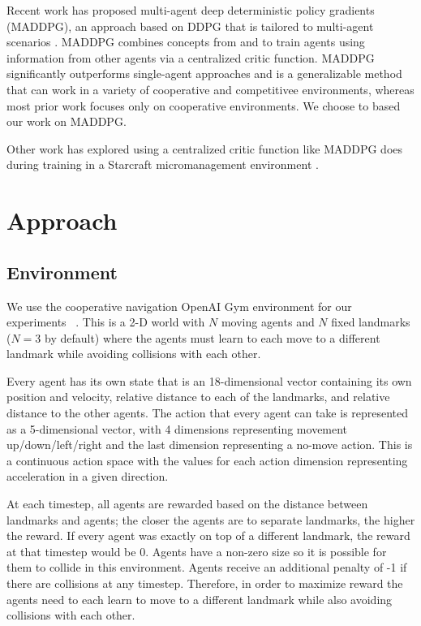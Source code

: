\documentclass{article}
\begin{document}
Recent work has proposed multi-agent deep deterministic policy gradients (MADDPG), an approach based on DDPG that is tailored to multi-agent scenarios \cite{maddpg}. MADDPG combines concepts from \cite{suttonbarto1998rl} and \cite{lillicrap2015continuous} to train agents using information from other agents via a centralized critic function. MADDPG significantly outperforms single-agent approaches and is a generalizable method that can work in a variety of cooperative and competitivee environments, whereas most prior work focuses only on cooperative environments. We choose to based our work on MADDPG.

Other work has explored using a centralized critic function like MADDPG does during training in a Starcraft micromanagement environment \cite{coma}.

\section{Approach}

\subsection{Environment}

We use the cooperative navigation OpenAI Gym environment for our experiments ~\cite{openaigym}. This is a 2-D world with $N$ moving agents and $N$ fixed landmarks ($N=3$ by default) where the agents must learn to each move to a different landmark while avoiding collisions with each other.

Every agent has its own state that is an 18-dimensional vector containing its own position and velocity, relative distance to each of the landmarks, and relative distance to the other agents. The action that every agent can take is represented as a 5-dimensional vector, with 4 dimensions representing movement up/down/left/right and the last dimension representing a no-move action. This is a continuous action space with the values for each action dimension representing acceleration in a given direction.

At each timestep, all agents are rewarded based on the distance between landmarks and agents; the closer the agents are to separate landmarks, the higher the reward. If every agent was exactly on top of a different landmark, the reward at that timestep would be 0. Agents have a non-zero size so it is possible for them to collide in this environment. Agents receive an additional penalty of -1 if there are collisions at any timestep. Therefore, in order to maximize reward the agents need to each learn to move to a different landmark while also avoiding collisions with each other.
\end{document}
